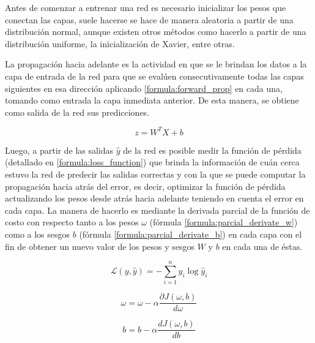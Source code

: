  Antes de comenzar a entrenar una red es necesario inicializar los pesos que conectan las capas, suele hacerse se hace de manera aleatoria a partir de una distribución normal, aunque existen otros métodos como hacerlo a partir de una distribución uniforme, la inicialización de Xavier, entre otras.
 
 La propagación hacia adelante es la actividad en que se le brindan los datos a la capa de entrada de la red para que se evalúen consecutivamente todas las capas siguientes en esa dirección aplicando \ref{formula:forward_prop} en cada una, tomando como entrada la capa inmediata anterior. De esta manera, se obtiene como salida de la red sus predicciones. 
 
 \begin{equation}\label{formula:forward_prop}
 z=W^{T} X+b
 \end{equation}
 
 Luego, a partir de las salidas \(\hat{y}\) de la red es posible medir la función de pérdida (detallado en \ref{formula:loss_function}) que brinda la información de cuán cerca estuvo la red de predecir las salidas correctas y con la que se puede computar la propagación hacia atrás del error, es decir, optimizar la función de pérdida actualizando los pesos desde atrás hacia adelante teniendo en cuenta el error en cada capa. La manera de hacerlo es mediante la derivada parcial de la función de costo con respecto tanto a los pesos \(\omega\) (fórmula \ref{formula:parcial_derivate_w}) como a los sesgos \(b\) (fórmula \ref{formula:parcial_derivate_b}) en cada capa con el fin de obtener un nuevo valor de los pesos y sesgos \(W\) y \(b\) en cada una de éstas.
  
 \begin{equation}\label{formula:loss_function}
 \mathcal{L}(y, \hat{y})=-\sum_{i=1}^{n} y_{i} \log \hat{y}_{i}
 \end{equation}
 
 \begin{equation}\label{formula:parcial_derivate_w}
 \omega =\omega-\alpha \frac{\partial J(\omega, b)}{d \omega}
 \end{equation}
 
 \begin{equation}\label{formula:parcial_derivate_b}
 b=b-\alpha \frac{d J(\omega, b)}{d b}
 \end{equation}
 
